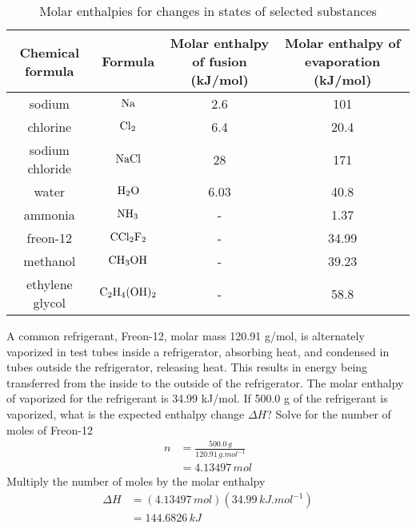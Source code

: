 \begin{table}[!ht]
    \scriptsize
    \centering
    \caption{Molar enthalpies for changes in states of selected substances}
    \setlength{\tabcolsep}{10pt}      %
    \renewcommand{\arraystretch}{1.2} %
    \begin{tabular}{|c|c|c|c|}
        \hline
        \rowcolor{HeaderColor}
        Chemical formula & Formula & Molar enthalpy of fusion (kJ/mol) & Molar enthalpy of evaporation (kJ/mol) \\ \hline
        sodium & $\ch{Na}$ & 2.6 & 101 \\ \hline
        chlorine & $\ch{Cl2}$ & 6.4 & 20.4 \\ \hline
        sodium chloride & $\ch{NaCl}$ & 28 & 171 \\ \hline
        water & $\ch{H2O}$ & 6.03 & 40.8 \\ \hline
        ammonia & $\ch{NH3}$ & - & 1.37 \\ \hline
        freon-12 & $\ch{CCl2F2}$ & - & 34.99 \\ \hline
        methanol & $\ch{CH3OH}$ & - & 39.23 \\ \hline
        ethylene glycol & $\ch{C2H4(OH)2}$ & - & 58.8 \\ \hline
    \end{tabular}
\end{table}

\begin{sample}{A common refrigerant, Freon-12, molar mass 120.91 g/mol, is alternately vaporized
    in test tubes inside a refrigerator, absorbing heat, and condensed in tubes outside the
    refrigerator, releasing heat. This results in energy being transferred from the inside to
    the outside of the refrigerator. The molar enthalpy of vaporized for the refrigerant is
    34.99 kJ/mol. If 500.0 g of the refrigerant is vaporized, what is the expected enthalpy
    change $\Delta H$?}
    Solve for the number of moles of Freon-12
    \begin{align*}
        n&=\frac{500.0\,\si{g}}{120.91\,\si{g.mol^{-1}}}\\
         &=4.13497\,\si{mol}
    \end{align*}
    Multiply the number of moles by the molar enthalpy
    \begin{align*}
        \Delta H&=(4.13497\,\si{mol})(34.99\,\si{kJ.mol^{-1}})\\
                &=144.6826\,\si{kJ}
    \end{align*}
\end{sample}

